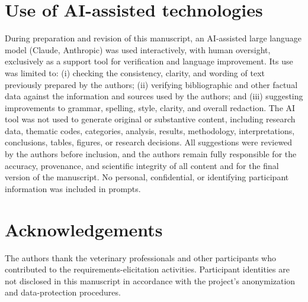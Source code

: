 \documentclass[pdflatex,sn-mathphys-num,Numbered]{sn-jnl}
\begin{document}
\section*{Use of AI-assisted technologies}
During preparation and revision of this manuscript, an AI-assisted large language model (Claude, Anthropic) was used interactively, with human oversight, exclusively as a support tool for verification and language improvement. Its use was limited to: (i) checking the consistency, clarity, and wording of text previously prepared by the authors; (ii) verifying bibliographic and other factual data against the information and sources used by the authors; and (iii) suggesting improvements to grammar, spelling, style, clarity, and overall redaction. The AI tool was not used to generate original or substantive content, including research data, thematic codes, categories, analysis, results, methodology, interpretations, conclusions, tables, figures, or research decisions. All suggestions were reviewed by the authors before inclusion, and the authors remain fully responsible for the accuracy, provenance, and scientific integrity of all content and for the final version of the manuscript. No personal, confidential, or identifying participant information was included in prompts.

\section*{Acknowledgements}
The authors thank the veterinary professionals and other participants who contributed to the requirements-elicitation activities. Participant identities are not disclosed in this manuscript in accordance with the project's anonymization and data-protection procedures.




\end{document}
